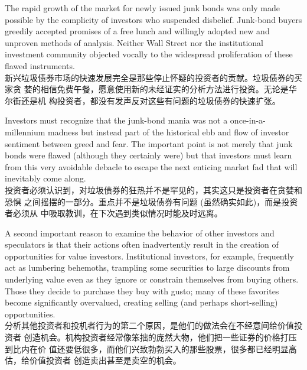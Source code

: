 \begin{verseparallel}
  {
    The rapid growth of the market for newly issued junk bonds was only made
    possible by the complicity of investors who suspended disbelief. Junk-bond
    buyers greedily accepted promises of a free lunch and willingly adopted new
    and unproven methods of analysis. Neither Wall Street nor the institutional
    investment community objected vocally to the widespread proliferation of
    these flawed instruments. \\
  }
  {
    新兴垃圾债券市场的快速发展完全是那些停止怀疑的投资者的贡献。垃圾债券的买家贪
    婪的相信免费午餐，愿意使用新的未经证实的分析方法进行投资。无论是华尔街还是机
    构投资者，都没有发声反对这些有问题的垃圾债券的快速扩张。
  }
\end{verseparallel}

\begin{verseparallel}
  {
    Investors must recognize that the junk-bond mania was not a
    once-in-a-millennium madness but instead part of the historical ebb and flow
    of investor sentiment between greed and fear. The important point is not
    merely that junk bonds were flawed (although they certainly were) but that
    investors must learn from this very avoidable debacle to escape the next
    enticing market fad that will inevitably come along. \\
  }
  {
    投资者必须认识到，对垃圾债券的狂热并不是罕见的，其实这只是投资者在贪婪和恐惧
    之间摇摆的一部分。重点并不是垃圾债券有问题{} (虽然确实如此)，而是投资者必须从
    中吸取教训，在下次遇到类似情况时能及时远离。
  }
\end{verseparallel}

\begin{verseparallel}
  {
    A second important reason to examine the behavior of other investors and
    speculators is that their actions often inadvertently result in the creation
    of opportunities for value investors. Institutional investors, for example,
    frequently act as lumbering behemoths, trampling some securities to large
    discounts from underlying value even as they ignore or constrain themselves
    from buying others. Those they decide to purchase they buy with gusto; many
    of these favorites become significantly overvalued, creating selling (and
    perhaps short-selling) opportunities. \\
  }
  {
    分析其他投资者和投机者行为的第二个原因，是他们的做法会在不经意间给价值投资者
    创造机会。机构投资者经常像笨拙的庞然大物，他们把一些证券的价格打压到比内在价
    值还要低很多，而他们兴致勃勃买入的那些股票，很多都已经明显高估，给价值投资者
    创造卖出甚至是卖空的机会。
  }
\end{verseparallel}

